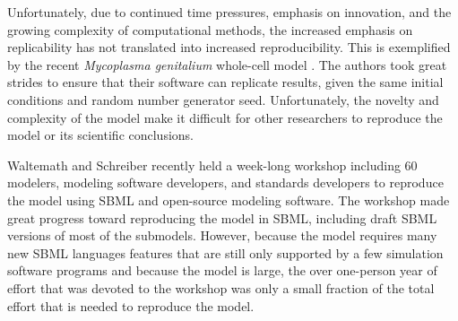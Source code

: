 \documentclass[journal,transmag,twoside]{IEEEtran}
\begin{document}
Unfortunately, due to continued time pressures, emphasis on innovation, and the growing complexity of computational methods, the increased emphasis on replicability has not translated into increased reproducibility. This is exemplified by the recent \textit{Mycoplasma genitalium} whole-cell model \cite{Karr2012}. The authors took great strides to ensure that their software can replicate results, given the same initial conditions and random number generator seed. Unfortunately, the novelty and complexity of the model make it difficult for other researchers to reproduce the model or its scientific conclusions. 

Waltemath and Schreiber recently held a week-long workshop including 60 modelers, modeling software developers, and standards developers to reproduce the model using SBML and open-source modeling software. The workshop made great progress toward reproducing the model in SBML, including draft SBML versions of most of the submodels. However, because the model requires many new SBML languages features that are still only supported by a few simulation software programs and because the model is large, the over one-person year of effort that was devoted to the workshop was only a small fraction of the total effort that is needed to reproduce the model.



\end{document}
